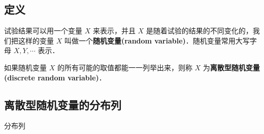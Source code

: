 
\subsection{定义}
试验结果可以用一个变量 $X$ 来表示，并且 $X$ 是随着试验的结果的不同变化的，我们把这样的变量 $X$ 叫做一个\textbf{随机变量(random variable)}．随机变量常用大写字母 $X,Y,\cdots$ 表示．

如果随机变量  $X$ 的所有可能的取值都能一一列举出来，则称 $X$ 为\textbf{离散型随机变量(discrete random variable)}．

\subsection{离散型随机变量的分布列}

\begin{table}
\centering
\caption{分布列}

\end{table}

